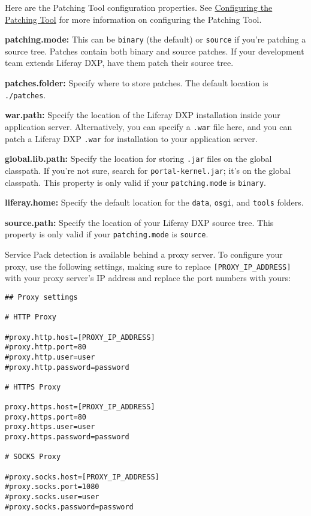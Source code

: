 Here are the Patching Tool configuration properties. See
\href{/docs/7-2/deploy/-/knowledge_base/d/configuring-the-patching-tool}{Configuring
the Patching Tool} for more information on configuring the Patching
Tool.

\textbf{patching.mode:} This can be \texttt{binary} (the default) or
\texttt{source} if you're patching a source tree. Patches contain both
binary and source patches. If your development team extends Liferay DXP,
have them patch their source tree.

\textbf{patches.folder:} Specify where to store patches. The default
location is \texttt{./patches}.

\textbf{war.path:} Specify the location of the Liferay DXP installation
inside your application server. Alternatively, you can specify a
\texttt{.war} file here, and you can patch a Liferay DXP \texttt{.war}
for installation to your application server.

\textbf{global.lib.path:} Specify the location for storing \texttt{.jar}
files on the global classpath. If you're not sure, search for
\texttt{portal-kernel.jar}; it's on the global classpath. This property
is only valid if your \texttt{patching.mode} is \texttt{binary}.

\textbf{liferay.home:} Specify the default location for the
\texttt{data}, \texttt{osgi}, and \texttt{tools} folders.

\textbf{source.path:} Specify the location of your Liferay DXP source
tree. This property is only valid if your \texttt{patching.mode} is
\texttt{source}.

Service Pack detection is available behind a proxy server. To configure
your proxy, use the following settings, making sure to replace
\texttt{{[}PROXY\_IP\_ADDRESS{]}} with your proxy server's IP address
and replace the port numbers with yours:

\begin{verbatim}
## Proxy settings

# HTTP Proxy

#proxy.http.host=[PROXY_IP_ADDRESS]
#proxy.http.port=80
#proxy.http.user=user
#proxy.http.password=password

# HTTPS Proxy

proxy.https.host=[PROXY_IP_ADDRESS]
proxy.https.port=80
proxy.https.user=user
proxy.https.password=password

# SOCKS Proxy

#proxy.socks.host=[PROXY_IP_ADDRESS]
#proxy.socks.port=1080
#proxy.socks.user=user
#proxy.socks.password=password
\end{verbatim}

